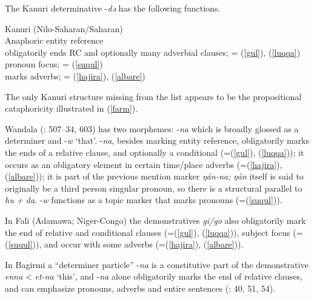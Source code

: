 \documentclass[output=paper]{langsci/langscibook}
\begin{document}
The Kanuri determinative -\textit{də} has the following functions.

\ea\label{kanuri} 
{}{}{Kanuri (Nilo-Saharan/Saharan)}\\

{}{}{Anaphoric entity reference}\\
  \ea
{}{}{obligatorily ends RC and optionally many adverbial clauses}; = (\ref{gul}), (\ref{luqqa})\\
\ex
{}{}{pronoun focus}; = (\ref{suqul})\\
\ex
{}{}{marks adverbs}; = (\ref{hajira}), (\ref{albare})\\
\z
\z

The only Kanuri structure missing from the list appears to be the propositional cataphoricity illustrated in (\ref{farm}).

Wandala (\citealt{Frajzyngier2012}: 507–34, 603) has two morphemes: -\textit{na} which is broadly glossed as a determiner and -\textit{w} ‘that’. -\textit{na}, besides marking entity reference, obligatorily marks the ends of a relative clause, and optionally a conditional (=(\ref{gul}), (\ref{luqqa})); it occurs as an obligatory element in certain time/place adverbs (=(\ref{hajira}), (\ref{albare})); it is part of the previous mention marker \textit{ŋán-na;} \textit{ŋán} itself is said to originally be a third person singular pronoun, so there is a structural parallel to \textit{hu} \textit{+} \textit{da}. -\textit{w} functions as a topic marker that marks pronouns (=(\ref{suqul})).

In Fali (Adamawa; Niger-Congo) the demonstratives \textit{gi/go} also obligatorily mark the end of relative and conditional clauses (=(\ref{gul}), (\ref{luqqa})), subject focus (=(\ref{suqul})), and occur with some adverbs (=(\ref{hajira}), (\ref{albare})).

In Bagirmi a “determiner particle” -\textit{na} is a constitutive part of the demonstrative \textit{enna} < \textit{et-na} ‘this’, and -\textit{na} alone obligatorily marks the end of relative clauses, and can emphasize pronouns, adverbs and entire sentences (\citealt{Stevenson1969}: 40, 51, 54). 
\end{document}
